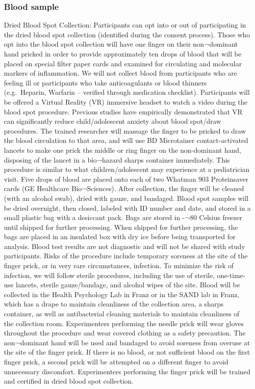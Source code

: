 \documentclass[
]{book}
\begin{document}
\hypertarget{blood-sample}{%
\subsubsection{Blood sample}\label{blood-sample}}

Dried Blood Spot Collection: Participants can opt into or out of participating in the dried blood spot collection (identified during the consent process). Those who opt into the blood spot collection will have one finger on their non¬dominant hand pricked in order to provide approximately ten drops of blood that will be placed on special filter paper cards and examined for circulating and molecular markers of inflammation. We will not collect blood from participants who are feeling ill or participants who take anticoagulants or blood thinners (e.g.~Heparin, Warfarin -- verified through medication checklist). Participants will be offered a Virtual Reality (VR) immersive headset to watch a video during the blood spot procedure. Previous studies have empirically demonstrated that VR can significantly reduce child/adolescent anxiety about blood spot/draw procedures. The trained researcher will massage the finger to be pricked to draw the blood circulation to that area, and will use BD Microtainer contact-activated lancets to make one prick the middle or ring finger on the non-dominant hand, disposing of the lancet in a bio¬hazard sharps container immediately. This procedure is similar to what children/adolescent may experience at a pediatrician visit. Five drops of blood are placed onto each of two Whatman 903 Proteinsaver cards (GE Healthcare Bio¬Sciences). After collection, the finger will be cleaned (with an alcohol swab), dried with gauze, and bandaged. Blood spot samples will be dried overnight, then closed, labeled with ID number and date, and stored in a small plastic bag with a desiccant pack. Bags are stored in -¬80 Celsius freezer until shipped for further processing. When shipped for further processing, the bags are placed in an insulated box with dry ice before being transported for analysis. Blood test results are not diagnostic and will not be shared with study participants. Risks of the procedure include temporary soreness at the site of the finger prick, or in very rare circumstances, infection. To minimize the risk of infection, we will follow sterile procedures, including the use of sterile, one-time-use lancets, sterile gauze/bandage, and alcohol wipes of the site. Blood will be collected in the Health Psychology Lab in Franz or in the SAND lab in Franz, which has a drape to maintain cleanliness of the collection area, a sharps container, as well as antibacterial cleaning materials to maintain cleanliness of the collection room. Experimenters performing the needle prick will wear gloves throughout the procedure and wear covered clothing as a safety precaution. The non¬dominant hand will be used and bandaged to avoid soreness from overuse at the site of the finger prick. If there is no blood, or not sufficient blood on the first finger prick, a second prick will be attempted on a different finger to avoid unnecessary discomfort. Experimenters performing the finger prick will be trained and certified in dried blood spot collection.
\end{document}

